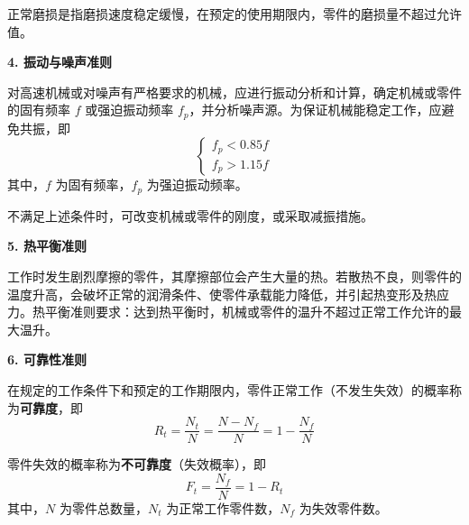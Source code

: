 \begin{note}
正常磨损是指磨损速度稳定缓慢，在预定的使用期限内，零件的磨损量不超过允许值。
\end{note}

\textbf{4. 振动与噪声准则}

\begin{definition}[振动与噪声准则]
\label{def:振动与噪声准则}
对高速机械或对噪声有严格要求的机械，应进行振动分析和计算，确定机械或零件的固有频率 $f$ 或强迫振动频率 $f_p$，并分析噪声源。为保证机械能稳定工作，应避免共振，即
\begin{equation}
	\begin{cases}
		f_p < 0.85f \\[0.5em]
		f_p > 1.15f
	\end{cases}
	\label{eq:概论:振动准则}
\end{equation}
其中，$f$ 为固有频率，$f_p$ 为强迫振动频率。
\end{definition}

\begin{note}
不满足上述条件时，可改变机械或零件的刚度，或采取减振措施。
\end{note}

\textbf{5. 热平衡准则}

\begin{definition}[热平衡准则]
\label{def:热平衡准则}
工作时发生剧烈摩擦的零件，其摩擦部位会产生大量的热。若散热不良，则零件的温度升高，会破坏正常的润滑条件、使零件承载能力降低，并引起热变形及热应力。热平衡准则要求：达到热平衡时，机械或零件的温升不超过正常工作允许的最大温升。
\end{definition}

\textbf{6. 可靠性准则}

\begin{definition}[可靠度]
\label{def:可靠度}
在规定的工作条件下和预定的工作期限内，零件正常工作（不发生失效）的概率称为\textbf{可靠度}，即
\begin{equation}
	R_t = \frac{N_t}{N} = \frac{N-N_f}{N} = 1-\frac{N_f}{N}
	\label{eq:概论:可靠度}
\end{equation}
\end{definition}

\begin{definition}[不可靠度]
\label{def:不可靠度}
零件失效的概率称为\textbf{不可靠度}（失效概率），即
\begin{equation}
	F_t = \frac{N_f}{N} = 1 - R_t
	\label{eq:概论:不可靠度}
\end{equation}
其中，$N$ 为零件总数量，$N_t$ 为正常工作零件数，$N_f$ 为失效零件数。
\end{definition}

